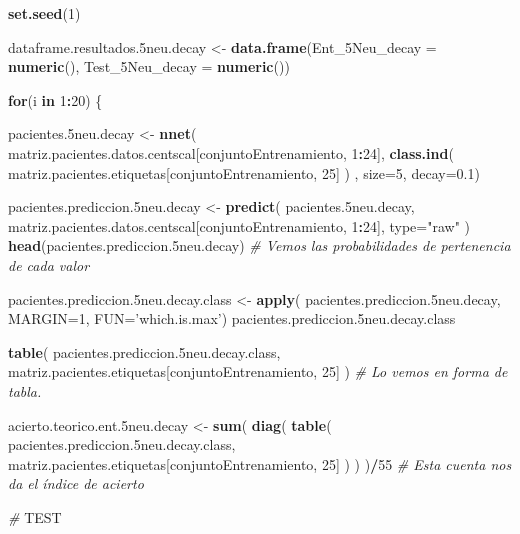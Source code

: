 \documentclass[]{article}
\newenvironment{Shaded}{\begin{snugshade}}{\end{snugshade}}
\newcommand{\KeywordTok}[1]{\textcolor[rgb]{0.13,0.29,0.53}{\textbf{#1}}}
\newcommand{\DataTypeTok}[1]{\textcolor[rgb]{0.13,0.29,0.53}{#1}}
\newcommand{\DecValTok}[1]{\textcolor[rgb]{0.00,0.00,0.81}{#1}}
\newcommand{\FloatTok}[1]{\textcolor[rgb]{0.00,0.00,0.81}{#1}}
\newcommand{\StringTok}[1]{\textcolor[rgb]{0.31,0.60,0.02}{#1}}
\newcommand{\CommentTok}[1]{\textcolor[rgb]{0.56,0.35,0.01}{\textit{#1}}}
\newcommand{\ControlFlowTok}[1]{\textcolor[rgb]{0.13,0.29,0.53}{\textbf{#1}}}
\newcommand{\OperatorTok}[1]{\textcolor[rgb]{0.81,0.36,0.00}{\textbf{#1}}}
\newcommand{\AlertTok}[1]{\textcolor[rgb]{0.94,0.16,0.16}{#1}}
\newcommand{\NormalTok}[1]{#1}
\begin{document}
\begin{Shaded}
\begin{Highlighting}[]
\KeywordTok{set.seed}\NormalTok{(}\DecValTok{1}\NormalTok{)}

\NormalTok{dataframe.resultados.5neu.decay <-}\StringTok{ }\KeywordTok{data.frame}\NormalTok{(}\DataTypeTok{Ent_5Neu_decay =} \KeywordTok{numeric}\NormalTok{(),}
                                              \DataTypeTok{Test_5Neu_decay =} \KeywordTok{numeric}\NormalTok{())}

\ControlFlowTok{for}\NormalTok{(i }\ControlFlowTok{in} \DecValTok{1}\OperatorTok{:}\DecValTok{20}\NormalTok{)}
\NormalTok{\{}

\NormalTok{  pacientes.5neu.decay <-}\StringTok{ }\KeywordTok{nnet}\NormalTok{( matriz.pacientes.datos.centscal[conjuntoEntrenamiento, }\DecValTok{1}\OperatorTok{:}\DecValTok{24}\NormalTok{], }\KeywordTok{class.ind}\NormalTok{( matriz.pacientes.etiquetas[conjuntoEntrenamiento, }\DecValTok{25}\NormalTok{] ) , }\DataTypeTok{size=}\DecValTok{5}\NormalTok{, }\DataTypeTok{decay=}\FloatTok{0.1}\NormalTok{)}
  
\NormalTok{  pacientes.prediccion.5neu.decay <-}\StringTok{ }\KeywordTok{predict}\NormalTok{( pacientes.5neu.decay, matriz.pacientes.datos.centscal[conjuntoEntrenamiento, }\DecValTok{1}\OperatorTok{:}\DecValTok{24}\NormalTok{], }\DataTypeTok{type=}\StringTok{"raw"}\NormalTok{ )}
  \KeywordTok{head}\NormalTok{(pacientes.prediccion.5neu.decay) }\CommentTok{# Vemos las probabilidades de pertenencia de cada valor}
  
\NormalTok{  pacientes.prediccion.5neu.decay.class <-}\StringTok{ }\KeywordTok{apply}\NormalTok{( pacientes.prediccion.5neu.decay, }\DataTypeTok{MARGIN=}\DecValTok{1}\NormalTok{, }\DataTypeTok{FUN=}\StringTok{'which.is.max'}\NormalTok{)}
\NormalTok{  pacientes.prediccion.5neu.decay.class}
  
  \KeywordTok{table}\NormalTok{( pacientes.prediccion.5neu.decay.class, matriz.pacientes.etiquetas[conjuntoEntrenamiento, }\DecValTok{25}\NormalTok{] )  }\CommentTok{# Lo vemos en forma de tabla.}
  
\NormalTok{  acierto.teorico.ent.5neu.decay <-}\StringTok{ }\KeywordTok{sum}\NormalTok{( }\KeywordTok{diag}\NormalTok{( }\KeywordTok{table}\NormalTok{( pacientes.prediccion.5neu.decay.class, matriz.pacientes.etiquetas[conjuntoEntrenamiento, }\DecValTok{25}\NormalTok{] ) ) )}\OperatorTok{/}\DecValTok{55} \CommentTok{# Esta cuenta nos da el índice de acierto}
  
  \CommentTok{# }\AlertTok{TEST}
  

\end{Highlighting}
\end{Shaded}
\end{document}
